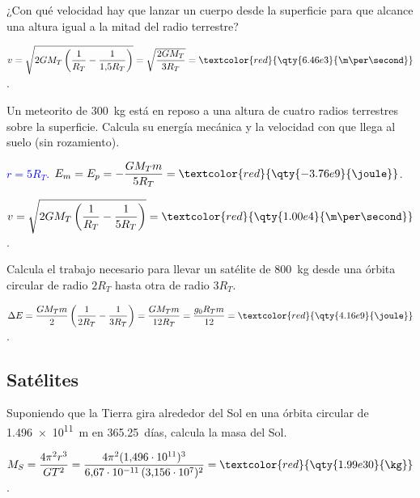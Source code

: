 \begin{exercise}
    ¿Con qué velocidad hay que lanzar un cuerpo desde la superficie para que alcance una altura igual a la mitad del radio terrestre?
    \begin{solu}
        \(v = \sqrt{2 G M_T\left(\dfrac{1}{R_T} - \dfrac{1}{1{,}5R_T}\right)} = \sqrt{\dfrac{2 G M_T}{3 R_T}} = \textcolor{red}{\qty{6.46e3}{\m\per\second}}\).
    \end{solu}
\end{exercise}

\begin{exercise}
    Un meteorito de \qty{300}{\kg} está en reposo a una altura de cuatro radios terrestres sobre la superficie. Calcula su
    energía mecánica y la velocidad con que llega al suelo (sin rozamiento).
    \begin{solu}
        \textcolor{blue}{\(r = 5R_T\).} \(E_m = E_p = -\dfrac{G M_T m}{5 R_T} = \textcolor{red}{\qty{-3.76e9}{\joule}}\).

        \(v = \sqrt{2 G M_T\left(\dfrac{1}{R_T} - \dfrac{1}{5R_T}\right)} = \textcolor{red}{\qty{1.00e4}{\m\per\second}}\).
    \end{solu}
\end{exercise}

\begin{exercise}
    Calcula el trabajo necesario para llevar un satélite de \qty{800}{\kg} desde una órbita circular de radio \(2R_T\) hasta otra
    de radio \(3R_T\).
    \begin{solu}
        \(\Delta E = \dfrac{G M_T m}{2}\left(\dfrac{1}{2R_T} - \dfrac{1}{3R_T}\right) = \dfrac{G M_T m}{12 R_T} = \dfrac{g_0 R_T m}{12} = \textcolor{red}{\qty{4.16e9}{\joule}}\).
    \end{solu}
\end{exercise}

\subsection{Satélites}

\begin{exercise}
    Suponiendo que la Tierra gira alrededor del Sol en una órbita circular de \qty{1.496e11}{\m} en \qty{365.25}{días}, calcula
    la masa del Sol.
    \begin{solu}
        \(M_S = \dfrac{4\pi^2 r^3}{G T^2} = \dfrac{4\pi^2(1{,}496\cdot 10^{11})^3}{6{,}67\cdot 10^{-11}\,(3{,}156\cdot 10^7)^2} = \textcolor{red}{\qty{1.99e30}{\kg}}\).
    \end{solu}
\end{exercise}

